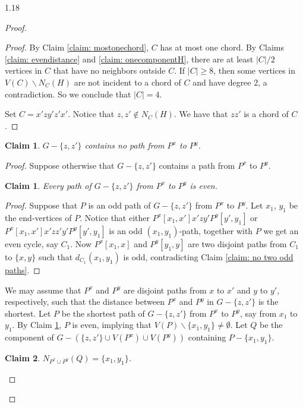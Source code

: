 \documentclass[10pt]{article}
\newtheorem{claim}{Claim}
\newtheorem{subclaim}{Claim}[claim]
\begin{document}
\begin{spacing}{1.18}
\begin{proof}
\begin{proof}
    By Claim \ref{claim: mostonechord}, $C$ has at most one chord. By Claims \ref{claim: evendistance} and \ref{claim: onecomponentH}, there are at least $|C|/2$ vertices in $C$ that have no neighbors outside $C$. If $|C|\geqslant 8$, then some vertices in $V(C)\backslash N_C(H)$ are not incident to a chord of $C$ and have degree 2, a contradiction. So we conclude that $|C|=4$.
        
    Set $C=x'zy'z'x'$. Notice that $z,z'\notin N_C(H)$. We have that $zz'$ is a chord of $C$.
\end{proof}

\begin{claim}\label{claim: nopathfromPxtoPy}
    $G-\{z,z'\}$ contains no path from $P^x$ to $P^y$.
\end{claim}

\begin{proof}
    Suppose otherwise that $G-\{z,z'\}$ contains a path from $P^x$ to $P^y$.

    \begin{subclaim}\label{claim: pathx-y-even}
        Every path of $G-\{z,z'\}$ from $P^x$ to $P^y$ is even.
    \end{subclaim}

    \begin{proof}
        Suppose that $P$ is an odd path of $G-\{z,z'\}$ from $P^x$ to $P^y$. Let $x_1$, $y_1$ be the end-vertices of $P$. Notice that either $P^x[x_1,x']x'zy'P^y[y',y_1]$ or $P^x[x_1,x']x'zz'y'P^y[y',y_1]$ is an odd $(x_1,y_1)$-path, together with $P$ we get an even cycle, say $C_1$. Now $P^x[x_1,x]$ and $P^y[y_1,y]$ are two disjoint paths from $C_1$ to $\{x,y\}$ such that $d_{C_1}(x_1,y_1)$ is odd, contradicting Claim \ref{claim: no two odd paths}. 
    \end{proof}
    
    We may assume that $P^x$ and $P^y$ are disjoint paths from $x$ to $x'$ and $y$ to $y'$, respectively, such that the distance between $P^x$ and $P^y$ in $G-\{z,z'\}$ is the shortest. Let $P$ be the shortest path of $G-\{z,z'\}$ from $P^x$ to $P^y$, say from $x_1$ to $y_1$. By Claim \ref{claim: pathx-y-even}, $P$ is even, implying that $V(P)\backslash\{x_1,y_1\}\neq\emptyset$. Let $Q$ be the component of $G-(\{z,z'\}\cup V(P^x)\cup V(P^y))$ containing $P-\{x_1,y_1\}$. 
    
    \begin{subclaim}\label{claim: NPxPyQ2}
        $N_{P^x\cup P^y}(Q)=\{x_1,y_1\}$.
    \end{subclaim}


\end{proof}
\end{proof}
\end{spacing}
\end{document}
